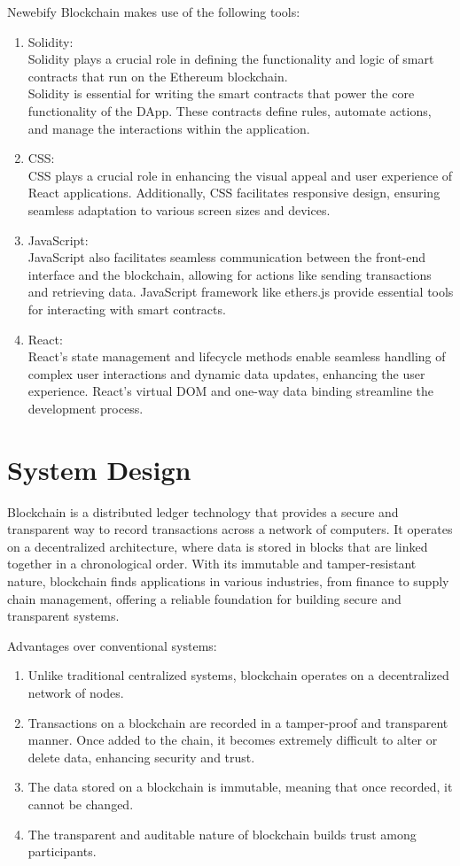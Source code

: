 \documentclass[12pt,a4paper]{article}
\begin{document}
Newebify Blockchain makes use of the following tools:
\begin{enumerate}
\item Solidity:\\Solidity plays a crucial role in defining the functionality and logic of smart contracts that run on the Ethereum blockchain.\\
Solidity is essential for writing the smart contracts that power the core functionality of the DApp. These contracts define rules, automate actions, and manage the interactions within the application.
\item CSS:\\CSS plays a crucial role in enhancing the visual appeal and user experience of React applications.
Additionally, CSS facilitates responsive design, ensuring seamless adaptation to various screen sizes and devices.\cite{css}
\item JavaScript: \\ JavaScript also facilitates seamless communication between the front-end interface and the blockchain, allowing for actions like sending transactions and retrieving data.
JavaScript framework like ethers.js provide essential tools for interacting with smart contracts.\cite{javascript}
\item React:\\React's state management and lifecycle methods enable seamless handling of complex user interactions and dynamic data updates, enhancing the user experience.
React's virtual DOM and one-way data binding streamline the development process.\cite{bootstrap}
\end{enumerate}
\newpage

\section{System Design}
Blockchain is a distributed ledger technology that provides a secure and transparent way to record transactions across a network of computers. It operates on a decentralized architecture, where data is stored in blocks that are linked together in a chronological order. With its immutable and tamper-resistant nature, blockchain finds applications in various industries, from finance to supply chain management, offering a reliable foundation for building secure and transparent systems.

Advantages over conventional systems:
\begin{enumerate}
\item Unlike traditional centralized systems, blockchain operates on a decentralized network of nodes.
\item Transactions on a blockchain are recorded in a tamper-proof and transparent manner. Once added to the chain, it becomes extremely difficult to alter or delete data, enhancing security and trust.
\item The data stored on a blockchain is immutable, meaning that once recorded, it cannot be changed.
\item The transparent and auditable nature of blockchain builds trust among participants.
\end{enumerate}
\end{document}
